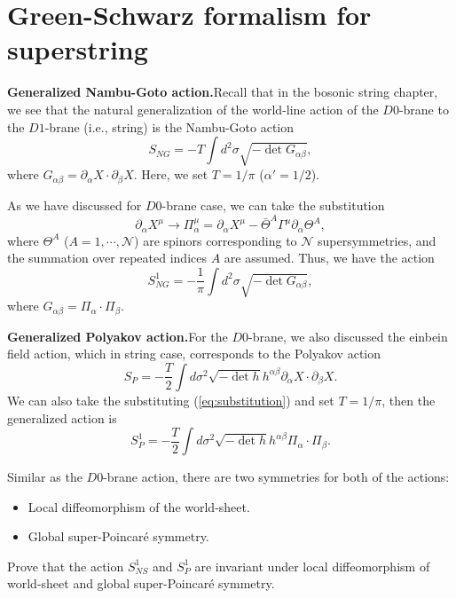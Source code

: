 \documentclass[graybox,envcountchap,sectrefs]{svmono}
\begin{document}
\section{Green-Schwarz formalism for superstring}
\textbf{Generalized Nambu-Goto action.}\textemdash Recall that in the bosonic string chapter, we see that the natural generalization of the world-line action of the $D0$-brane to the $D1$-brane (i.e., string) is the Nambu-Goto action
\begin{equation}
S_{NG}=-T\int d^2\sigma \sqrt{-\operatorname{det}G_{\alpha\beta}}	,
\end{equation}
where $G_{\alpha\beta}=\partial_{\alpha} X \cdot \partial_{\beta}X$. Here, we set $T=1/\pi$ ($\alpha'=1/2$).

As we have discussed for $D0$-brane case, we can take the substitution
\begin{equation}\label{eq:substitution}
\partial_{\alpha}X^{\mu}\to \Pi^{\mu}_{\alpha}=\partial_{\alpha}X^{\mu}-\bar{\Theta}^A\Gamma^{\mu}\partial_{\alpha}\Theta^A,	
\end{equation}
where $\Theta^A$ ($A=1,\cdots,\mathcal{N}$) are spinors corresponding to $\mathcal{N}$ supersymmetries, and the summation over repeated indices $A$ are assumed. Thus, we have the action
\begin{equation}
S_{NG}^1=-\frac{1}{\pi}	\int d^2\sigma \sqrt{-\operatorname{det}G_{\alpha\beta}},
\end{equation}
where $G_{\alpha\beta}=\Pi_{\alpha}\cdot \Pi_{\beta}$.




\textbf{Generalized Polyakov action.}\textemdash For the $D0$-brane, we also discussed the einbein field action, which in string case, corresponds to the Polyakov action
\begin{equation}
S_{P}=	-\frac{T}{2}	\int d\sigma^2 \sqrt{-\det h}h^{\alpha\beta}\partial_{\alpha}X\cdot \partial_{\beta}X. 
\end{equation}
We can also take the substituting (\ref{eq:substitution}) and set $T=1/\pi$, then the generalized action is
\begin{equation}
S_{P}^1=	-\frac{T}{2}	\int d\sigma^2 \sqrt{-\det h}h^{\alpha\beta}\Pi_{\alpha}\cdot \Pi_{\beta}. 
\end{equation}


Similar as the $D0$-brane action, there are two symmetries for both of the actions:
\begin{itemize}
\item Local diffeomorphism of the world-sheet.
\item Global super-Poincar\'{e} symmetry.
\end{itemize}
\begin{exercise}
Prove that the action $S_{NS}^1$ and $S_P^1$ are invariant under local diffeomorphism of world-sheet and global super-Poincar\'{e} symmetry.	
\end{exercise}
\end{document}
